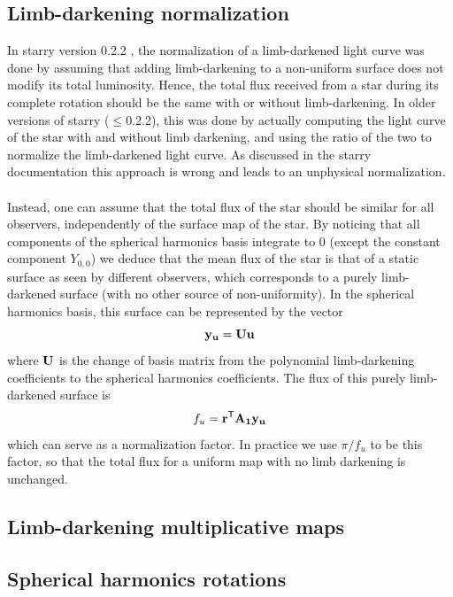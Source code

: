 \documentclass[modern]{aastex631}
\begin{document}
\subsection{Limb-darkening normalization}
In \textsf{starry} version 0.2.2 \citep{starry}, the normalization of a limb-darkened light curve was done by assuming that adding limb-darkening to a non-uniform surface does not modify its total luminosity. Hence, the total flux received from a star during its complete rotation should be the same with or without limb-darkening. In older versions of starry ($\le$0.2.2), this was done by actually computing the light curve of the star with and without limb darkening, and using the ratio of the two to normalize the limb-darkened light curve. As discussed in the \textsf{starry} documentation this approach is wrong and leads to an unphysical normalization.\\\\
Instead, one can assume that the total flux of the star should be similar for all observers, independently of the surface map of the star. By noticing that all components of the spherical harmonics basis integrate to 0 (except the constant component $Y_{0,0}$) we deduce that the mean flux of the star is that of a static surface as seen by different observers, which corresponds to a purely limb-darkened surface (with no other source of non-uniformity). In the spherical harmonics basis, this surface can be represented by the vector
\begin{equation}
    \bvec{y_u} = \bvec{U}\bvec{u}
\end{equation}
where ${\mathbf{U}}$ is the change of basis matrix from the polynomial limb-darkening coefficients to the spherical harmonics coefficients. The flux of this purely limb-darkened surface is
\begin{equation}
    f_u = \bvec{r}^\mathsf{T}\bvec{A_1}\bvec{y_u}
\end{equation}
which can serve as a normalization factor. In practice we use $\pi/f_u$ to be this factor, so that the total flux for a uniform map with no limb darkening is unchanged.

\subsection{Limb-darkening multiplicative maps}
\subsection{Spherical harmonics rotations}
\end{document}
